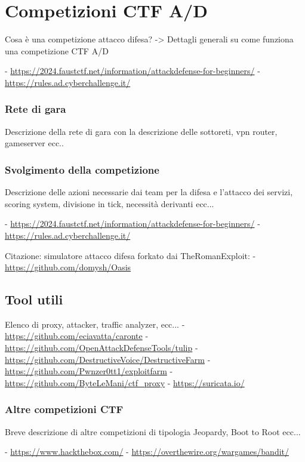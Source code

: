 \chapter{Competizioni CTF A/D}

Cosa è una competizione attacco difesa?
-> Dettagli generali su come funziona una competizione CTF A/D

- \url{https://2024.faustctf.net/information/attackdefense-for-beginners/}
- \url{https://rules.ad.cyberchallenge.it/}

\subsection{Rete di gara}

Descrizione della rete di gara con la descrizione delle sottoreti, vpn router, gameserver ecc..

\subsection{Svolgimento della competizione}

Descrizione delle azioni necessarie dai team per la difesa e l'attacco dei servizi, scoring
system, divisione in tick, necessità derivanti ecc...

- \url{https://2024.faustctf.net/information/attackdefense-for-beginners/}
- \url{https://rules.ad.cyberchallenge.it/}

Citazione: simulatore attacco difesa forkato dai TheRomanExploit: - \url{https://github.com/domysh/Oasis}

\section{Tool utili}

Elenco di proxy, attacker, traffic analyzer, ecc...
- \url{https://github.com/eciavatta/caronte}
- \url{https://github.com/OpenAttackDefenseTools/tulip}
- \url{https://github.com/DestructiveVoice/DestructiveFarm}
- \url{https://github.com/Pwnzer0tt1/exploitfarm}
- \url{https://github.com/ByteLeMani/ctf_proxy}
- \url{https://suricata.io/}

\subsection{Altre competizioni CTF}

Breve descrizione di altre competizioni di tipologia Jeopardy, Boot to Root ecc...

- \url{https://www.hackthebox.com/}
- \url{https://overthewire.org/wargames/bandit/}
